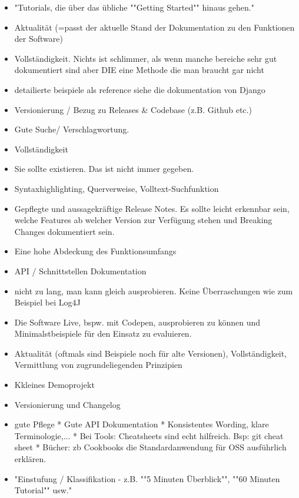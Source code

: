 \begin{multicols}{2}
\begin{itemize}
        \item "Tutorials, die über das übliche ""Getting Started"" hinaus gehen."
        \item Aktualität (=passt der aktuelle Stand der Dokumentation zu den Funktionen der Software)
        \item Vollständigkeit. Nichts ist schlimmer, als wenn manche bereiche sehr gut dokumentiert sind aber DIE eine Methode die man braucht gar nicht
        \item detailierte beispiele als reference siehe die dokumentation von Django
        \item Versionierung / Bezug zu Releases \& Codebase (z.B. Github etc.)
        \item Gute Suche/ Verschlagwortung.
        \item Vollständigkeit
        \item Sie sollte existieren. Das ist nicht immer gegeben.
        \item Syntaxhighlighting, Querverweise, Volltext-Suchfunktion
        \item Gepflegte und aussagekräftige Release Notes. Es sollte leicht erkennbar sein, welche Features ab welcher Version zur Verfügung stehen und Breaking Changes dokumentiert sein.
        \item Eine hohe Abdeckung des Funktionsumfangs
        \item API / Schnittstellen Dokumentation
        \item nicht zu lang, man kann gleich ausprobieren. Keine Überraschungen wie zum Beispiel bei Log4J
        \item Die Software Live, bspw. mit Codepen, ausprobieren zu können und Minimalstbeispiele für den Einsatz zu evaluieren.
        \item Aktualität (oftmals sind Beispiele noch für alte Versionen), Vollständigkeit, Vermittlung von zugrundeliegenden Prinzipien
        \item Kkleines Demoprojekt
        \item Versionierung und Changelog
        \item gute Pflege
              * Gute API Dokumentation
              * Konsistentes Wording, klare Terminologie,...
              * Bei Tools: Cheatsheets sind echt hilfreich. Bsp: git cheat sheet
              * Bücher: zb Cookbooks die Standardanwendung für OSS ausführlich erklären.
        \item "Einstufung / Klassifikation - z.B. ""5 Minuten Überblick"", ""60 Minuten Tutorial"" usw."

\end{itemize}
\end{multicols}
